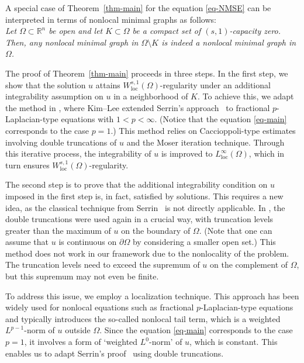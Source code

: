 \documentclass{amsart}
\theoremstyle{plain}
\theoremstyle{definition}
\numberwithin{equation}{section}
\begin{document}
A special case of Theorem~\ref{thm-main} for the equation \eqref{eq-NMSE} can be interpreted in terms of nonlocal minimal graphs as follows: \vspace{0.2cm}\\ 
\emph{Let $\Omega \subset \mathbb{R}^n$ be open and let $K \subset \Omega$ be a compact set of $(s, 1)$-capacity zero. Then, any nonlocal minimal graph in $\Omega \setminus K$ is indeed a nonlocal minimal graph in $\Omega$.} \vspace{0.2cm}

The proof of Theorem~\ref{thm-main} proceeds in three steps. In the first step, we show that the solution $u$ attains $W^{s, 1}_{\mathrm{loc}}(\Omega)$-regularity under an additional integrability assumption on $u$ in a neighborhood of $K$. To achieve this, we adapt the method in \cite{KL24}, where Kim--Lee extended Serrin's approach~\cite{Ser64} to fractional $p$-Laplacian-type equations with $1<p<\infty$. (Notice that the equation \eqref{eq-main} corresponds to the case $p=1$.) This method relies on Caccioppoli-type estimates involving double truncations of $u$ and the Moser iteration technique. Through this iterative process, the integrability of $u$ is improved to $L^\infty_{\mathrm{loc}}(\Omega)$, which in turn ensures $W^{s, 1}_{\mathrm{loc}}(\Omega)$-regularity.

The second step is to prove that the additional integrability condition on $u$ imposed in the first step is, in fact, satisfied by solutions. This requires a new idea, as the classical technique from Serrin~\cite{Ser65} is not directly applicable. In \cite{Ser65}, the double truncations were used again in a crucial way, with truncation levels greater than the maximum of $u$ on the boundary of $\Omega$. (Note that one can assume that $u$ is continuous on $\partial \Omega$ by considering a smaller open set.) This method does not work in our framework due to the nonlocality of the problem. The truncation levels need to exceed the supremum of $u$ on the complement of $\Omega$, but this supremum may not even be finite.

To address this issue, we employ a localization technique. This approach has been widely used for nonlocal equations such as fractional $p$-Laplacian-type equations and typically introduces the so-called nonlocal tail term, which is a weighted $L^{p-1}$-norm of $u$ outside $\Omega$. Since the equation \eqref{eq-main} corresponds to the case $p=1$, it involves a form of `weighted $L^0$-norm' of $u$, which is constant. This enables us to adapt Serrin's proof~\cite{Ser65} using double truncations.
\end{document}

